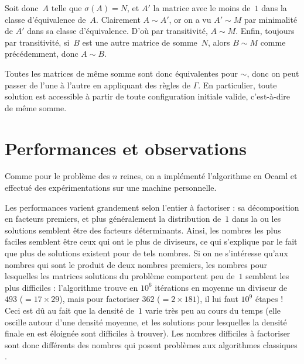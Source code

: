Soit donc~$A$ telle que $\sigma(A)=N$, et $A'$ la matrice avec le moins de~$1$ dans la classe d'équi\-valence de~$A$. Clairement $A \sim A'$, or on a vu $A'\sim M$ par minimalité de $A'$ dans sa classe d'équivalence. D'où par transitivité, $A \sim M$. Enfin, toujours par transitivité, si~$B$ est une autre matrice de somme~$N$, alors $B \sim M$ comme précédemment, donc $A \sim B$.

Toutes les matrices de même somme sont donc équivalentes pour $\sim$, donc on peut passer de l'une à l'autre en appliquant des règles de $\Gamma$. En particulier, toute solution est accessible à partir de toute configuration initiale valide, c'est-à-dire de même somme. 



\section{Performances et observations}

Comme pour le problème des $n$ reines, on a implémenté l'algorithme en Ocaml et effectué des expérimentations sur une machine personnelle.

Les  performances   varient  grandement  selon   l'entier  à  factoriser   :  sa
dé\-composition  en  facteurs premiers,  et  plus  généralement la  distribution
de~$1$ dans la ou les  solutions semblent être des facteurs déterminants. Ainsi,
les nombres les plus faciles semblent être ceux qui ont le plus de diviseurs, ce
qui  s'explique  par  le fait  que  plus  de  solutions  existent pour  de  tels
nombres. Si on ne s'intéresse qu'aux nombres qui sont le produit de deux nombres
premiers,  les  nombres  pour  lesquelles  les matrices  solutions  du  problème
comportent  peu de~$1$  semblent les  plus difficiles  : l'algorithme  trouve en
$10^6$ itérations en moyenne  un diviseur de  $493$ ($ = 17\times  29$), mais
pour factoriser $362$ ($  = 2\times 181$), il lui faut $10^9$  étapes ! Ceci est
dû au fait que la densité de~$1$  varie très peu au cours du temps (elle oscille
autour d'une densité moyenne, et les solutions pour lesquelles la densité finale
en est éloignée sont difficiles à trouver). Les nombres difficiles à factoriser sont donc différents des nombres qui posent problèmes aux algorithmes classiques \cite{Pom96}.


